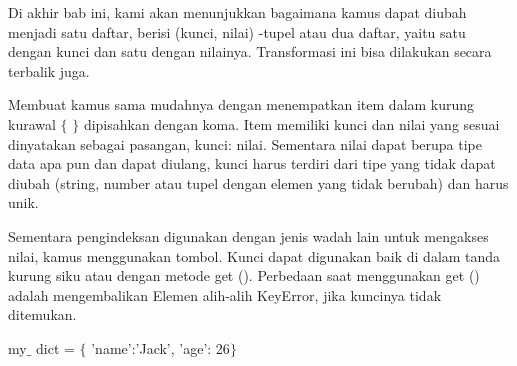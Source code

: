 \vspace{\baselineskip}
\noindent \hspace*{0.5in}Di akhir bab ini, kami akan menunjukkan bagaimana kamus dapat diubah menjadi satu \hspace*{0.5in}daftar, berisi (kunci, nilai) -tupel atau dua daftar, yaitu satu dengan kunci dan satu dengan \hspace*{0.5in}nilainya. Transformasi ini bisa dilakukan secara terbalik juga.\par

\vspace{\baselineskip}
\vspace{12pt}
\vspace{\baselineskip}

\noindent \hspace*{0.5in}Membuat kamus sama mudahnya dengan menempatkan item dalam kurung kurawal $ \{ $ $ \} $  \hspace*{0.5in}dipisahkan dengan koma. Item memiliki kunci dan nilai yang sesuai dinyatakan sebagai \hspace*{0.5in}pasangan, kunci: nilai. Sementara nilai dapat berupa tipe data apa pun dan dapat diulang, \hspace*{0.5in}kunci harus terdiri dari tipe yang tidak dapat diubah (string, number atau tupel dengan \hspace*{0.5in}elemen yang tidak berubah) dan harus unik.\par

\vspace{\baselineskip}
\vspace{12pt}
\noindent \hspace*{0.5in}Sementara pengindeksan digunakan dengan jenis wadah lain untuk mengakses nilai, kamus \hspace*{0.5in}menggunakan tombol. Kunci dapat digunakan baik di dalam tanda kurung siku atau dengan \hspace*{0.5in}metode get (). Perbedaan saat menggunakan get () adalah mengembalikan Elemen alih-alih \hspace*{0.5in}KeyError, jika kuncinya tidak ditemukan.\par

\vspace{\baselineskip}
\noindent \hspace*{0.5in}\hspace*{0.5in}my$ \_ $ dict = $ \{ $ 'name':'Jack', 'age': 26$ \} $ \par


